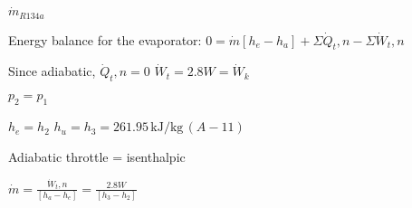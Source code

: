 \( \dot{m}_{R134a} \)  

Energy balance for the evaporator:  
\( 0 = \dot{m} [h_e - h_a] + \Sigma \dot{Q}_t,n - \Sigma \dot{W}_t,n \)  

Since adiabatic, \( \dot{Q}_t,n = 0 \)  
\( \dot{W}_t = 2.8W = \dot{W}_k \)  

\( p_2 = p_1 \)  

\( h_e = h_2 \)  
\( h_u = h_3 = 261.95 \, \text{kJ/kg} \, (A-11) \)  

Adiabatic throttle = isenthalpic  

\( \dot{m} = \frac{\dot{W}_t,n}{[h_a - h_e]} = \frac{2.8W}{[h_3 - h_2]} \)